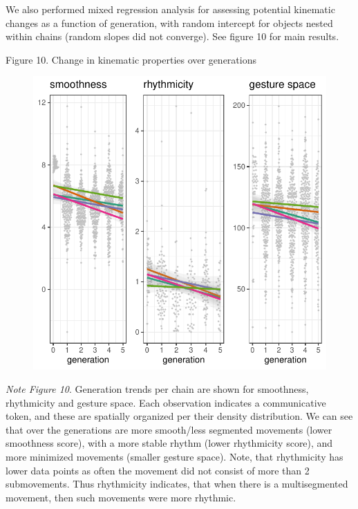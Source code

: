 \documentclass[
  man, noextraspace,floatsintext]{apa6}
\begin{document}
We also performed mixed regression analysis for assessing potential kinematic changes as a function of generation, with random intercept for objects nested within chains (random slopes did not converge). See figure 10 for main results.

Figure 10. Change in kinematic properties over generations\\

\begin{figure}

{\centering \includegraphics{GNet_WP_files/figure-latex/kinematicresults-1} 

}

\caption{ }\label{fig:kinematicresults}
\end{figure}

\emph{Note Figure 10}. \small Generation trends per chain are shown for smoothness, rhythmicity and gesture space. Each observation indicates a communicative token, and these are spatially organized per their density distribution. We can see that over the generations are more smooth/less segmented movements (lower smoothness score), with a more stable rhythm (lower rhythmicity score), and more minimized movements (smaller gesture space). Note, that rhythmicity has lower data points as often the movement did not consist of more than 2 submovements. Thus rhythmicity indicates, that when there is a multisegmented movement, then such movements were more rhythmic. \normalsize
\end{document}
